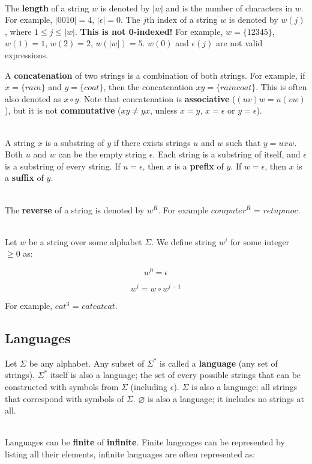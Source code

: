 \documentclass[12pt]{article}
\begin{document}
\noindent
\\
The \textbf{length} of a string $w$ is denoted by $|w|$ and is the number of characters in $w$.
For example, $|0010| = 4$, $|\epsilon| = 0$.
The $j$th index of a string $w$ is denoted by $w(j)$, where $1 \leq j \leq |w|$.
\textbf{This is not 0-indexed!}
For example, $w = \{ 12345 \}$, $w(1) = 1$, $w(2) = 2$, $w(|w|) = 5$.
$w(0)$ and $\epsilon(j)$ are not valid expressions.

\newpage
\noindent
A \textbf{concatenation} of two strings is a combination of both strings.
For example, if $x = \{ rain \}$ and $y = \{ coat \}$, then the concatenation $xy = \{ raincoat \}$.
This is often also denoted as $x \circ y$.
Note that concatenation is \textbf{associative} ($(uv)w = u(vw)$), but it is not \textbf{commutative} ($xy \neq yx$, unless $x = y$, $x = \epsilon$ or $y = \epsilon$).

\noindent
\\
A string $x$ is a substring of $y$ if there exists strings $u$ and $w$ such that $y = uxw$.
Both $u$ and $w$ can be the empty string $\epsilon$.
Each string is a substring of itself, and $\epsilon$ is a substring of every string.
If $u = \epsilon$, then $x$ is a \textbf{prefix} of $y$.
If $w = \epsilon$, then $x$ is a \textbf{suffix} of $y$.

\noindent
\\
The \textbf{reverse} of a string is denoted by $w^R$.
For example $computer^R$ = $retupmoc$. 

\noindent
\\
Let $w$ be a string over some alphabet $\Sigma$.
We define string $w^i$ for some integer $\geq 0$ as:

\[ w^0 = \epsilon \]

\[ w^i = w \circ w^{i - 1} \]

\noindent
For example, $cat^3$ = $catcatcat$.

\subsection*{Languages}
Let $\Sigma$ be any alphabet.
Any subset of $\Sigma^*$ is called a \textbf{language} (any set of strings).
$\Sigma^*$ itself is also a language; the set of every possible strings that can be constructed with symbols from $\Sigma$ (including $\epsilon$).
$\Sigma$ is also a language; all strings that correspond with symbols of $\Sigma$.
$\varnothing$ is also a language; it includes no strings at all.

\noindent
\\
Languages can be \textbf{finite} of \textbf{infinite}.
Finite languages can be represented by listing all their elements, infinite languages are often represented as:
\end{document}
